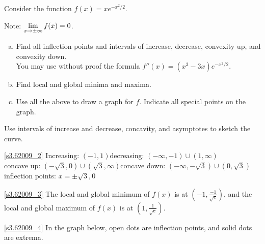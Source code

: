 \begin{Mquestion}[2009H]\label{s3.6.6explast}
Consider the function $f(x) = xe^{-x^2/2}$.

Note: $\displaystyle\lim_{x \to \pm\infty}f(x)=0$.
\begin{enumerate}[(a)]
\item\label{s3.62009_2} Find all inflection points and intervals of increase, decrease,
 convexity up, and convexity down. \\You may use without proof the formula
$f''(x) = (x^3-3x)e^{-x^2/2}$.
\item\label{s3.62009_3} Find local and global minima and maxima.
\item\label{s3.62009_4}  Use all the above to draw a graph for $f$. Indicate all
special points on the graph.
\end{enumerate}
\end{Mquestion}
\begin{hint}
Use intervals of increase and decrease, concavity, and asymptotes to sketch the curve.
\end{hint}
\begin{answer}
\eqref{s3.62009_2}
Increasing: $(-1,1)$\qquad decreasing: $(-\infty,-1)\cup (1,\infty)$\\
concave up: $(-\sqrt{3},0) \cup (\sqrt{3},\infty)$\qquad concave down: $(-\infty,-\sqrt{3}) \cup (0 ,\sqrt{3})$\\
inflection points: $x=\pm\sqrt{3}, 0$

\eqref{s3.62009_3}
The local and global minimum of $f(x)$ is at $(-1,\frac{-1}{\sqrt{e}})$, and the local and global maximum of $f(x)$ is at $(1,\frac{1}{\sqrt{e}})$.

\eqref{s3.62009_4}
In the graph below, open dots are inflection points, and
solid dots are extrema.
\begin{center}\end{center}
\end{answer}
